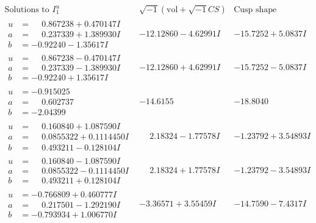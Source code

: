 \documentclass[1p]{elsarticle_modified}
\theoremstyle{definition}
\newcommand{\I}{\sqrt{-1}}
\begin{document}
$$\begin{array}{c|c|c}  
\text{Solutions to }I^u_{1}& \I (\text{vol} + \sqrt{-1}CS) & \text{Cusp shape}\\
 \hline 
\begin{aligned}
u &= \phantom{-}0.867238 + 0.470147 I \\
a &= \phantom{-}0.237339 + 1.389930 I \\
b &= -0.92240 - 1.35617 I\end{aligned}
 & -12.12860 - 4.62991 I & -15.7252 + 5.0837 I \\ \hline\begin{aligned}
u &= \phantom{-}0.867238 - 0.470147 I \\
a &= \phantom{-}0.237339 - 1.389930 I \\
b &= -0.92240 + 1.35617 I\end{aligned}
 & -12.12860 + 4.62991 I & -15.7252 - 5.0837 I \\ \hline\begin{aligned}
u &= -0.915025\phantom{ +0.000000I} \\
a &= \phantom{-}0.602737\phantom{ +0.000000I} \\
b &= -2.04399\phantom{ +0.000000I}\end{aligned}
 & -14.6155\phantom{ +0.000000I} & -18.8040\phantom{ +0.000000I} \\ \hline\begin{aligned}
u &= \phantom{-}0.160840 + 1.087590 I \\
a &= \phantom{-}0.0855322 + 0.1114450 I \\
b &= \phantom{-}0.493211 - 0.128104 I\end{aligned}
 & \phantom{-}2.18324 - 1.77578 I & -1.23792 + 3.54893 I \\ \hline\begin{aligned}
u &= \phantom{-}0.160840 - 1.087590 I \\
a &= \phantom{-}0.0855322 - 0.1114450 I \\
b &= \phantom{-}0.493211 + 0.128104 I\end{aligned}
 & \phantom{-}2.18324 + 1.77578 I & -1.23792 - 3.54893 I \\ \hline\begin{aligned}
u &= -0.766809 + 0.460777 I \\
a &= \phantom{-}0.217501 - 1.292190 I \\
b &= -0.793934 + 1.006770 I\end{aligned}
 & -3.36571 + 3.55459 I & -14.7590 - 7.4317 I \\ \hline\begin{aligned}

\end{aligned}
\end{array}$$
\end{document}
